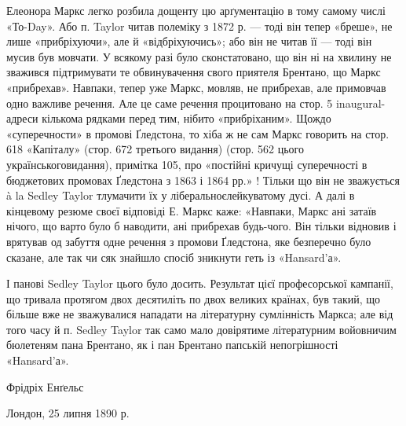 Елеонора Маркс легко розбила дощенту цю арґументацію в тому самому числі «То-Day». Або п. Taylor
читав полеміку з 1872 р. — тоді він тепер «бреше», не лише «прибріхуючи», але й «відбріхуючись»; або
він не читав її — тоді він мусив був
мовчати. У всякому разі було сконстатовано, що він ні на хвилину не зважився підтримувати те
обвинувачення свого приятеля Брентано, що Маркс «прибрехав». Навпаки, тепер уже Маркс, мовляв, не
прибрехав, але примовчав одно важливе речення. Але це саме речення процитовано на стор. 5
inaugural-адреси кількома рядками перед тим, нібито «прибріханим». Щождо «суперечности» в промові
Ґледстона, то хіба ж не сам Маркс говорить на стор. 618 «Капіталу» (стор. 672 третього видання)
(стор. 562 цього українськоговидання), примітка 105, про «постійні кричущі суперечності в бюджетових
промовах Ґледстона з 1863 і 1864 рр.» ! Тільки що
він не зважується à la Sedley Taylor тлумачити їх у ліберальноєлейкуватому
дусі. А далі в кінцевому резюме своєї відповіді Е. Маркс каже: «Навпаки, Маркс ані затаїв нічого, що
варто
було б наводити, ані прибрехав будь-чого. Він тільки відновив
і врятував од забуття одне речення з промови Ґледстона, яке безперечно
було сказане, але так чи сяк знайшло спосіб зникнути
геть із «Hansard’а».

І панові Sedley Taylor цього було досить. Результат цієї професорської
кампанії, що тривала протягом двох десятиліть
по двох великих країнах, був такий, що більше вже не зважувалися
нападати на літературну сумлінність Маркса; але від
того часу й п. Sedley Taylor так само мало довірятиме літературним
войовничим бюлетеням пана Брентано, як і пан Брентано
папській непогрішності «Hansard’а».

Фрідріх Енґельс

Лондон, 25 липня 1890 р.
